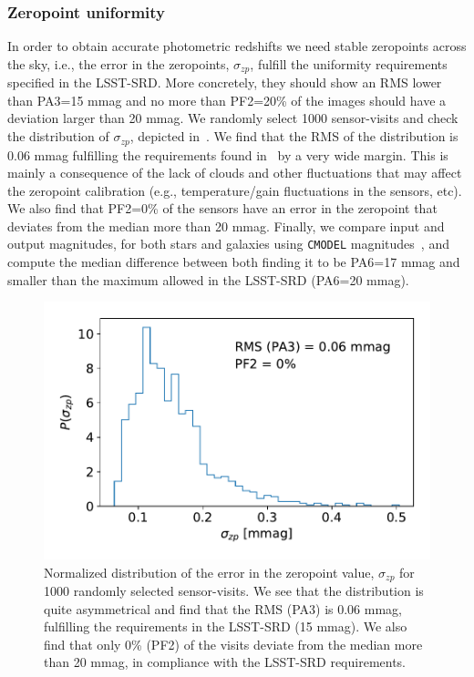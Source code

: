 \documentclass[\docopts]{\docclass}
\begin{document}
\subsubsection{Zeropoint uniformity}
\label{sssec:zeropoints}
In order to obtain accurate photometric redshifts we need stable zeropoints across the sky, i.e., the error in the zeropoints, $\sigma_{zp}$, fulfill the uniformity requirements specified in the LSST-SRD. More concretely, they should show an RMS lower than PA3=15 mmag and no more than PF2=20\% of the images should have a deviation larger than 20 mmag. We randomly select 1000 sensor-visits and check the distribution of $\sigma_{zp}$, depicted in~. We find that the RMS of the distribution is 0.06 mmag fulfilling the requirements found in~\citep{LPM-17} by a very wide margin. This is mainly a consequence of the lack of clouds and other fluctuations that may affect the zeropoint calibration (e.g., temperature/gain fluctuations in the sensors, etc). We also find that PF2=0\% of the sensors have an error in the zeropoint that deviates from the median more than 20 mmag. Finally, we compare input and output magnitudes, for both stars and galaxies using \texttt{CMODEL} magnitudes~\citep{2018PASJ...70S...5B}, and compute the median difference between both finding it to be PA6=17 mmag and smaller than the maximum allowed in the LSST-SRD (PA6=20 mmag). 
\begin{figure}
\centering
\includegraphics[width=0.85\columnwidth]{PA234.pdf}
\caption{Normalized distribution of the error in the zeropoint value, $\sigma_{zp}$ for 1000 randomly selected sensor-visits. We see that the distribution is quite asymmetrical and find that the RMS (PA3) is 0.06 mmag, fulfilling the requirements in the LSST-SRD (15 mmag). We also find that only 0\% (PF2) of the visits deviate from the median more than 20 mmag, in compliance with the LSST-SRD requirements.}
\label{fig:PA34}
\end{figure}
\end{document}

